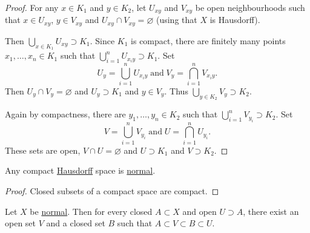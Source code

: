 \documentclass{article}
\renewcommand{\emptyset}{\varnothing}
\begin{document}
\begin{proof}
    For any $x \in K_1$ and $y \in K_2$, let $U_{xy}$ and $V_{xy}$ be open neighbourhoods such that $x \in U_{xy}$, $y \in V_{xy}$ and $U_{xy} \cap V_{xy} = \emptyset$ (using that $X$ is Hausdorff).

    Then $\bigcup_{x \in K_1} U_{xy} \supset K_1$. Since $K_1$ is compact, there are finitely many points $x_1, \dotsc, x_n \in K_1$ such that $\bigcup_{i=1}^n U_{x_i y} \supset K_1$. Set
    \begin{equation*}
        U_y = \bigcup_{i=1}^n U_{x_i y} \; \text{and} \; V_y = \bigcap_{i=1}^n V_{x_i y}.
    \end{equation*}
    Then $U_y \cap V_y = \emptyset$ and $U_y \supset K_1$ and $y \in V_y$. Thus $\bigcup_{y \in K_2} V_y \supset K_2$.

    Again by compactness, there are $y_1, \dotsc, y_n \in K_2$ such that $\bigcup_{i=1}^n V_{y_i} \supset K_2$. Set
    \begin{equation*}
        V = \bigcup_{i=1}^n V_{y_i} \; \text{and} \; U = \bigcap_{i=1}^n U_{y_i}.
    \end{equation*}
    These sets are open, $V \cap U = \emptyset$ and $U \supset K_1$ and $V \supset K_2$.
\end{proof}


\begin{cor}
    Any compact \hyperlink{def:Hausdorff}{Hausdorff} space is \hyperlink{def:normal}{normal}.
\end{cor}

\begin{proof}
    Closed subsets of a compact space are compact.
\end{proof}


\begin{fact}
    Let $X$ be \hyperlink{def:normal}{normal}. Then for every closed $A \subset X$ and open $U \supset A$, there exist an open set $V$ and a closed set $B$ such that $A \subset V \subset B \subset U$.
\end{fact}
\end{document}
